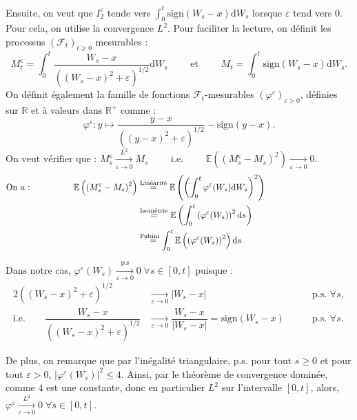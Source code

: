 \documentclass[openany]{book}
\makeatletter
\newcommand{\F}{\mathscr{F}}
\newcommand{\R}{\mathbb{R}}
\newcommand{\E}{\mathbb{E}}
\newcommand{\1}{\mathbbm{1}}
\newcommand{\sign}{\text{sign}}
\renewcommand{\d}{\mathrm{d}}
\renewenvironment{proof}[1][\textbf{\textit{Démonstration}}]{%
  \par\pushQED{\qed}%
  \normalfont\topsep6\p@\@plus6\p@\relax
  \trivlist\item[\hskip\labelsep
    #1\@addpunct{.}]\ignorespaces
}{%
  \popQED\endtrivlist\@endpefalse
}
\theoremstyle{thmfont}
\theoremstyle{deffont}
\theoremstyle{thmfont}
\theoremstyle{deffont}
\makeatother
\begin{document}
\begin{proof}
  
  \noindent Ensuite, on veut que \hyperlink{termI1}{$I_2^\varepsilon$} tende vers $\int_0^t \sign(W_s-x)\d W_s$ lorsque $\varepsilon$ tend vers $0$. Pour cela, on utilise la convergence $L^2$. Pour faciliter la lecture, on définit les processus $(\F_t)_{t\geq0}$ mesurables :
  $$M^\varepsilon_t = \int_0^t \dfrac{W_s-x}{((W_s-x)^2 +\varepsilon)^{1/2}}\d W_s \qquad\text{ et }\qquad M_t =  \int_0^t \sign(W_s -x)\d W_s.$$%
  On définit également la famille de fonctions $\F_t$-mesurables $(\varphi^\varepsilon)_{\varepsilon>0}$, définies sur $\R$ et à valeurs dans $\R^+$ comme :
  $$\varphi^\varepsilon : y \mapsto\dfrac{y-x}{((y-x)^2 +\varepsilon)^{1/2}} - \sign(y -x).$$
%
  $$\text{On veut vérifier que : }M^\varepsilon_s \xrightarrow[\varepsilon \to 0]{L^2} M_s \qquad \text{ i.e. } \qquad \E\left(\left(M^\varepsilon_s - M_s\right)^2\right) \xrightarrow[\varepsilon \to 0]{} 0.\qquad\qquad\qquad\qquad\qquad\qquad$$
\begin{align}
  \text{On a :}\qquad\qquad\quad
  \E\left(\left(M^\varepsilon_s - M_s\right)^2\right) &\overset{\text{Linéarité}}{=} \E \left( \left(\int_0^t\varphi^\varepsilon(W_s)\d W_s\right)^2 \right)\qquad\qquad\qquad\qquad\qquad\notag\\
  &\overset{\text{Isométrie}}{=} \E\left( \int_0^t\left( \varphi^\varepsilon(W_s) \right)^2 \d s\right)\label{arg:cvL2}\\
  &\overset{\text{Fubini}}{\;\;\;=}\int_0^t\E\left( \left(\varphi^\varepsilon(W_s)\right)^2 \right)\d s\notag
\end{align}

\noindent Dans notre cas, $\varphi^\varepsilon(W_s) \xrightarrow[\varepsilon \to 0]{\text{p.s}} 0\;\forall s \in [0,t]$ puisque :
\begin{alignat*}{2}
((W_s-x)^2 +\varepsilon)^{1/2} &\xrightarrow[\varepsilon\to 0]{} |W_s - x| \;\quad&&\text{p.s. } \forall s,\\
\text{i.e.}\qquad \dfrac{W_s-x}{((W_s-x)^2 +\varepsilon)^{1/2}} &\xrightarrow[\varepsilon \to 0]{} \dfrac{W_s-x}{|W_s - x|} = \sign(W_s -x)\quad\;&&\text{p.s. } \forall s.
\end{alignat*}


\noindent De plus, on remarque que par l'inégalité triangulaire, p.s. pour tout $s \geq 0$ et pour tout $\varepsilon > 0$, 
$|\varphi^\varepsilon(W_s)|^2 \leq 4$. Ainsi, par le théorème de convergence dominée, comme $4$ est une constante, donc en particulier $L^2$ sur l'intervalle $[0,t]$, alors, $\varphi^\varepsilon \xrightarrow[\varepsilon \to 0]{L^2} 0\;\forall s \in [0,t]$.


\end{proof}
\end{document}
